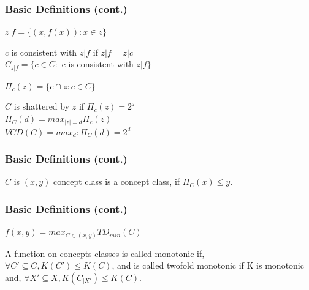 \documentclass{beamer}
\begin{document}
\begin{frame}
\frametitle{Basic Definitions (cont.)}


\begin{definition}
$z|f = \{ (x,f(x)) : x \in z \}$
\end{definition}

\begin{definition}
$c$ is consistent with $z|f$ if $z|f = z|c$ \\
$C_{z|f} = \{ c\in C:$ c is consistent with $z|f\}$
\end{definition}

\begin{definition}
$\Pi_c(z) = \{ c \cap  z: c \in C \}$
\end{definition}

\end{frame}



\begin{frame}
\begin{definition}
$C$ is shattered by $z$ if $\Pi_c(z) = 2 ^ z$ \\
$\Pi_C(d) = max_{|z| = d} \Pi_c(z)$ \\
$VCD(C) = max_d: \Pi_C(d) = 2^d$
\end{definition}

\frametitle{Basic Definitions (cont.)}
\begin{definition}
$C$ is $(x,y)$ concept class is a concept class, if $\Pi_C(x) \leq y$.
\end{definition}
\end{frame}


\begin{frame}
\frametitle{Basic Definitions (cont.)}


\begin{definition}
$f(x,y) = max_{C \in (x,y)} TD_{min}(C)$
\end{definition}

\begin{definition}
A function on concepts classes is called monotonic if, $\forall C' \subseteq C, K(C') \leq K(C)$, and is called twofold monotonic if K is monotonic and, $\forall X' \subseteq X, K(C_{|X'}) \leq K(C)$.
\end{definition}
\end{frame}
\end{document}
